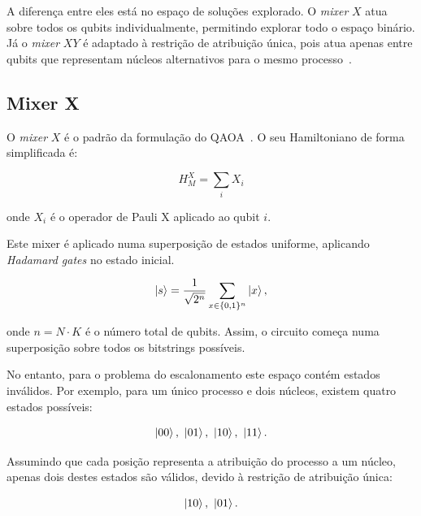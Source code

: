 A diferença entre eles está no espaço de soluções explorado. O \textit{mixer} $X$ atua sobre todos os qubits individualmente, permitindo explorar todo o espaço binário. Já o \textit{mixer} $XY$ é adaptado à restrição de atribuição única, pois atua apenas entre qubits que representam núcleos alternativos para o mesmo processo~\cite{Wang2019XYMixers,Fuchs2022ConstrainedMixers}.

\subsection{Mixer X}
\label{subsec:mixer-x}

O \textit{mixer} $X$ é o padrão da formulação do \acs{QAOA}~\cite{Farhi2014QAOA}. O seu Hamiltoniano de forma simplificada é:

\begin{equation}
    H_M^X=\sum_i X_i
\end{equation}

onde $X_i$ é o operador de Pauli X aplicado ao qubit $i$.

Este mixer é aplicado numa superposição de estados uniforme, aplicando \textit{Hadamard gates} no estado inicial.

\begin{equation}
    \ket{s} = \frac{1}{\sqrt{2^n}} \sum_{x \in \{0,1\}^n} \ket{x},
\end{equation}

onde $n=N \cdot K$ é o número total de qubits. Assim, o circuito começa numa superposição sobre todos os bitstrings possíveis.

No entanto, para o problema do escalonamento este espaço contém estados inválidos. Por exemplo, para um único processo e dois núcleos, existem
quatro estados possíveis:

\begin{equation}
    \ket{00},\ \ket{01},\ \ket{10},\ \ket{11}.
\end{equation}

Assumindo que cada posição representa a atribuição do processo a um núcleo, apenas
dois destes estados são válidos, devido à restrição de atribuição única:

\begin{equation}
    \ket{10},\ \ket{01}.
\end{equation}

